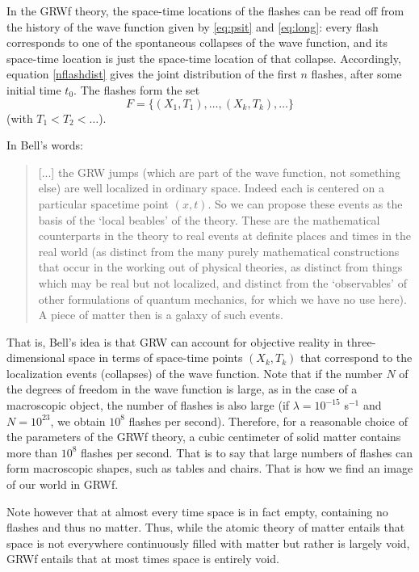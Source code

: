 \documentclass[12pt]{article}
\begin{document}
In the {\sf GRWf} theory, the space-time locations of the flashes can be read
off from the history of the wave function  {given by \eqref{eq:psit} and \eqref{eq:long}}: every flash corresponds to one of the spontaneous collapses of the wave function, and its space-time location is just the space-time location of that
collapse. 
Accordingly, equation \eqref{nflashdist} gives  the joint distribution  of the first $n$ flashes, after some initial   time $t_0$.
The flashes form the set
\[
  F=\{(X_{1},T_{1}), \ldots, (X_{k},T_{k}), \ldots\}
\]
(with $T_1<T_2<\ldots$).

In Bell's words:
\begin{quote}
[...] the GRW jumps (which are part of the wave function, not something else) are well localized in ordinary space. Indeed each is centered on a particular spacetime point $(x,t)$. So we can propose these events as the basis of the `local beables' of the theory. These are the mathematical counterparts in the theory to real events at definite places and times in the real world (as distinct from the many purely mathematical constructions that occur in the working out of physical theories, as distinct from things which may be real but not localized, and distinct from the `observables' of other formulations of quantum mechanics, for which we have no use here).  A piece of matter then is a galaxy of such events.
~\citep{Bell87}
\end{quote}
That is, Bell's idea is that {\sf GRW} can account for objective reality in three-dimensional space in terms of space-time points $(X_{k},T_{k})$
that correspond to the localization events (collapses) of the wave function. 
Note that if the number $N$ of the degrees of freedom in the wave function is large, as in the case of a macroscopic object, the number of flashes is also large (if $\lambda=10^{-15}$ s$^{-1}$ and $N=10^{23}$, we obtain $10^{8}$ flashes per second).
Therefore, for a reasonable choice of the parameters of the {\sf GRWf} theory, a cubic centimeter of
solid matter contains more than $10^8$ flashes per second.
That is to say that large numbers of flashes can form macroscopic shapes, such as tables and chairs. That is how we find an image of our world in {\sf GRWf}. 

Note however that at almost every time space is in fact empty, containing no flashes and thus no matter.
Thus, while the atomic theory of matter entails that space is not everywhere continuously filled with matter but rather is largely void, {\sf GRWf} entails that at most times space is entirely void.
\end{document}
